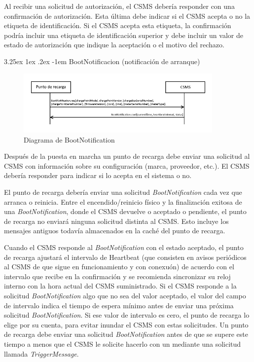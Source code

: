 \documentclass[12pt,a4paper,onecolumn,oneside]{report}
\makeatletter
\renewcommand\paragraph{\@startsection{paragraph}{5}{\z@}%
  {3.25ex \@plus1ex \@minus.2ex}%
  {-1em}%
  {\normalfont\normalsize\bfseries}}
\makeatother
\begin{document}
Al recibir una solicitud de autorización, el CSMS debería responder con una confirmación de autorización. Esta última debe indicar si el CSMS acepta o no la etiqueta de identificación. Si el CSMS acepta esta etiqueta, la confirmación podría incluir una etiqueta de identificación superior y debe incluir un valor de estado de autorización que indique la aceptación o el motivo del rechazo.


\paragraph{BootNotificacion (notificación de arranque)}
\label{BootNotificacion (notificación de arranque)}


\begin{figure}[H] 
\centering
  \includegraphics[width=0.9\textwidth]{figuras/diagramabootnotification.png}
  \caption[Diagrama de \textit{BootNotification}]{Diagrama de BootNotification\\
  }
  \label{fig:diagramabootnotification}
\end{figure}


Después de la puesta en marcha un punto de recarga debe enviar una solicitud al CSMS con información sobre su configuración (marca, proveedor, etc.). El CSMS debería responder para indicar si lo acepta en el sistema o no.

El punto de recarga debería enviar una solicitud \textit{BootNotification} cada vez que arranca o reinicia. Entre el encendido/reinicio físico y la finalización exitosa de una \textit{BootNotification}, donde el CSMS devuelve o aceptado o pendiente, el punto de recarga no enviará ninguna solicitud distinta al CSMS. Esto incluye los mensajes antiguos todavía almacenados en la caché del punto de recarga.

Cuando el CSMS responde al \textit{BootNotification} con el estado aceptado, el punto de recarga ajustará el intervalo de Heartbeat (que consisten en avisos periódicos al CSMS de que sigue en funcionamiento y con conexuón) de acuerdo con el intervalo que recibe en la confirmación y se recomienda sincronizar su reloj interno con la hora actual del CSMS suministrado. Si el CSMS responde a la solicitud \textit{BootNotification} algo que no sea del valor aceptado, el valor del campo de intervalo indica el tiempo de espera mínimo antes de enviar una próxima solicitud \textit{BootNotification}. Si ese valor de intervalo es cero, el punto de recarga lo elige por su cuenta, para evitar inundar el CSMS con estas solicitudes. Un punto de recarga debe enviar una solicitud \textit{BootNotification} antes de que se supere este tiempo a menos que el CSMS le solicite hacerlo con un mediante una solicitud llamada \textit{TriggerMessage}.
\end{document}
